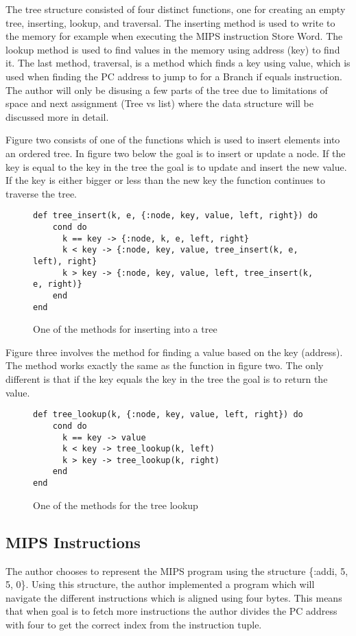 \documentclass[a4paper,11pt]{article}
\begin{document}
The tree structure consisted of four distinct functions, one for creating an empty tree, inserting, lookup, and traversal. The inserting method is used to write to the memory for example when executing the MIPS instruction Store Word. The lookup method is used to find values in the memory using address (key) to find it. The last method, traversal, is a method which finds a key using value, which is used when finding the PC address to jump to for a Branch if equals instruction. The author will only be disusing a few parts of the tree due to limitations of space and next assignment (Tree vs list) where the data structure will be discussed more in detail.

Figure two consists of one of the functions which is used to insert elements into an ordered tree. In figure two below the goal is to insert or update a node. If the key is equal to the key in the tree the goal is to update and insert the new value. If the key is either bigger or less than the new key the function continues to traverse the tree.

\begin{figure}[H]
\begin{verbatim}
def tree_insert(k, e, {:node, key, value, left, right}) do
    cond do
      k == key -> {:node, k, e, left, right}
      k < key -> {:node, key, value, tree_insert(k, e, left), right}
      k > key -> {:node, key, value, left, tree_insert(k, e, right)}
    end
end
\end{verbatim}
\caption{One of the methods for inserting into a tree}
\label{Figure:2}
\end{figure}

Figure three involves the method for finding a value based on the key (address). The method works exactly the same as the function in figure two. The only different is that if the key equals the key in the tree the goal is to return the value.

\begin{figure}[H]
\begin{verbatim}
def tree_lookup(k, {:node, key, value, left, right}) do
    cond do
      k == key -> value
      k < key -> tree_lookup(k, left)
      k > key -> tree_lookup(k, right)
    end
end
\end{verbatim}
\caption{One of the methods for the tree lookup}
\label{Figure:3}
\end{figure}

\subsection*{MIPS Instructions}
The author chooses to represent the MIPS program using the structure \{:addi, 5, 5, 0\}. Using this structure, the author implemented a program which will navigate the different instructions which is aligned using four bytes. This means that when goal is to fetch more instructions the author divides the PC address with four to get the correct index from the instruction tuple.
\end{document}
